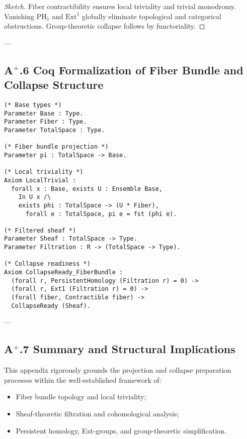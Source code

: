 \documentclass[11pt]{article}
\begin{document}
\begin{proof}[Sketch]
Fiber contractibility ensures local triviality and trivial monodromy. Vanishing $\mathrm{PH}_1$ and $\mathrm{Ext}^1$ globally eliminate topological and categorical obstructions. Group-theoretic collapse follows by functoriality.
\end{proof}

---

\subsection*{A$^{+}$.6 Coq Formalization of Fiber Bundle and Collapse Structure}

\begin{lstlisting}[language=Coq]
(* Base types *)
Parameter Base : Type.
Parameter Fiber : Type.
Parameter TotalSpace : Type.

(* Fiber bundle projection *)
Parameter pi : TotalSpace -> Base.

(* Local triviality *)
Axiom LocalTrivial :
  forall x : Base, exists U : Ensemble Base,
    In U x /\
    exists phi : TotalSpace -> (U * Fiber),
      forall e : TotalSpace, pi e = fst (phi e).

(* Filtered sheaf *)
Parameter Sheaf : TotalSpace -> Type.
Parameter Filtration : R -> (TotalSpace -> Type).

(* Collapse readiness *)
Axiom CollapseReady_FiberBundle :
  (forall r, PersistentHomology (Filtration r) = 0) ->
  (forall r, Ext1 (Filtration r) = 0) ->
  (forall fiber, Contractible fiber) ->
  CollapseReady (Sheaf).
\end{lstlisting}

---

\subsection*{A$^{+}$.7 Summary and Structural Implications}

This appendix rigorously grounds the projection and collapse preparation processes within the well-established framework of:

\begin{itemize}
    \item Fiber bundle topology and local triviality;
    \item Sheaf-theoretic filtration and cohomological analysis;
    \item Persistent homology, Ext-groups, and group-theoretic simplification.
\end{itemize}
\end{document}
